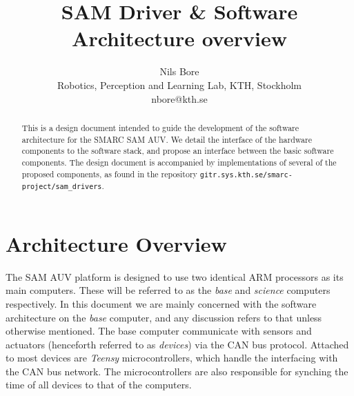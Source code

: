 \documentclass[9pt,technote]{IEEEtran} %
\begin{document}

\title{SAM Driver \& Software Architecture overview}%
\author{Nils Bore\\ %
Robotics, Perception and Learning Lab, KTH, Stockholm\\
nbore@kth.se} %

\maketitle

\begin{abstract}
This is a design document intended to guide the development
of the software architecture for the SMARC SAM AUV.
We detail the interface of the hardware components to the
software stack, and propose an interface between
the basic software components. The design document
is accompanied by implementations of several of the
proposed components, as found in the repository
\texttt{gitr.sys.kth.se/smarc-project/sam\_drivers}.
\end{abstract}


\section{Architecture Overview}
\label{overview}

The SAM AUV platform is designed to use two identical ARM processors as its main computers.
These will be referred to as the \textit{base} and \textit{science} computers respectively.
In this document we are mainly concerned with the software architecture on the \textit{base}
computer, and any discussion refers to that unless otherwise mentioned.
The base computer communicate with sensors and actuators (henceforth referred to as \textit{devices})
via the CAN bus protocol. Attached to most devices are \textit{Teensy} microcontrollers, which
handle the interfacing with the CAN bus network. The microcontrollers are also responsible for
synching the time of all devices to that of the computers.
\end{document}

